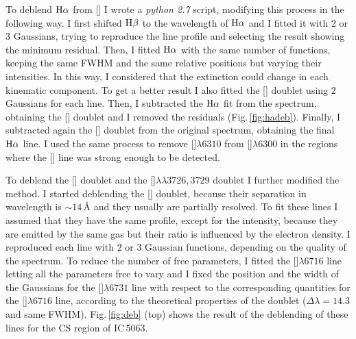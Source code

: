 \documentclass[../main.tex]{subfiles}
\begin{document}
To deblend $\rm H\alpha$ from [] I wrote a \textit{python 2.7} script, modifying this process in the following way. 
I first shifted $\rm H\beta$ to the wavelength of $\rm H\alpha$ and I fitted it with $2$ or $3$ Gaussians, trying to reproduce the line profile and selecting the result showing the minimum residual.
Then, I fitted $\rm H\alpha$ with the same number of functions, keeping the same FWHM and the same relative positions but varying their intensities.
In this way, I considered that the extinction could change in each kinematic component.
To get a better result I also fitted the [] doublet using $2$ Gaussians for each line.
Then, I subtracted the $\rm H\alpha$ fit from the spectrum, obtaining the [] doublet and I removed the residuals (Fig.\,\ref{fig:hadeb}).
Finally, I subtracted again the [] doublet from the original spectrum, obtaining the final $\rm H\alpha$ line.
I used the same process to remove []$\lambda6310$ from []$\lambda6300$ in the regions where the [] line was strong enough to be detected.

To deblend the [] doublet and the []$\lambda\lambda3726,3729$ doublet I further modified the method.
I started deblending the [] doublet, because their separation in wavelength is $\sim 14\,\si{\angstrom}$ and they usually are partially resolved.
To fit these lines I assumed that they have the same profile, except for the intensity, because they are emitted by the same gas but their ratio is influenced by the electron density.
I reproduced each line with $2$ or $3$ Gaussian functions, depending on the quality of the spectrum.
To reduce the number of free parameters, I fitted the []$\lambda6716$ line letting all the parameters free to vary and I fixed the position and the width of the Gaussians for the []$\lambda6731$ line with respect to the corresponding quantities for the []$\lambda6716$ line, according to the theoretical properties of the doublet ($\Delta \lambda = 14.3$ and same FWHM).
Fig.\,\ref{fig:deb} (top) shows the result of the deblending of these lines for the CS region of IC\,5063.
\end{document}
